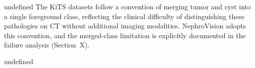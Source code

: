 undefined
The KiTS datasets follow a convention of merging tumor and cyst into a single foreground class, reflecting the clinical difficulty of distinguishing these pathologies on CT without additional imaging modalities. NephroVision adopts this convention, and the merged-class limitation is explicitly documented in the failure analysis (Section~X).


undefined